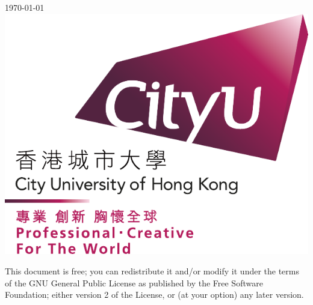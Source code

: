 \documentclass[UTF8,a4paper,openany]{book}
\theoremstyle{plain}					%
\theoremstyle{definition}
\begin{document}
\begin{titlepage}



{\large \today}\\[2cm] %

\vspace{5cm}
\includegraphics[scale=0.5]{figures/CityU_full_logo_2015.pdf}\\[1cm] %


\vfill %
\end{titlepage}

\noindent

This document is free; you can redistribute it and/or modify it under the terms of 
the GNU General Public License as published by the Free Software Foundation; either 
version 2 of the License, or (at your option) any later version.
\end{document}
